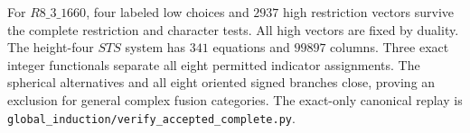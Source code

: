For $R8\_3\_1660$, four labeled low choices and $2937$ high restriction
vectors survive the complete restriction and character tests. All high
vectors are fixed by duality. The height-four $STS$ system has $341$
equations and $99897$ columns. Three exact integer functionals separate
all eight permitted indicator assignments. The spherical alternatives
and all eight oriented signed branches close, proving an exclusion for
general complex fusion categories. The exact-only canonical replay is
\texttt{global\_induction/verify\_accepted\_complete.py}.
